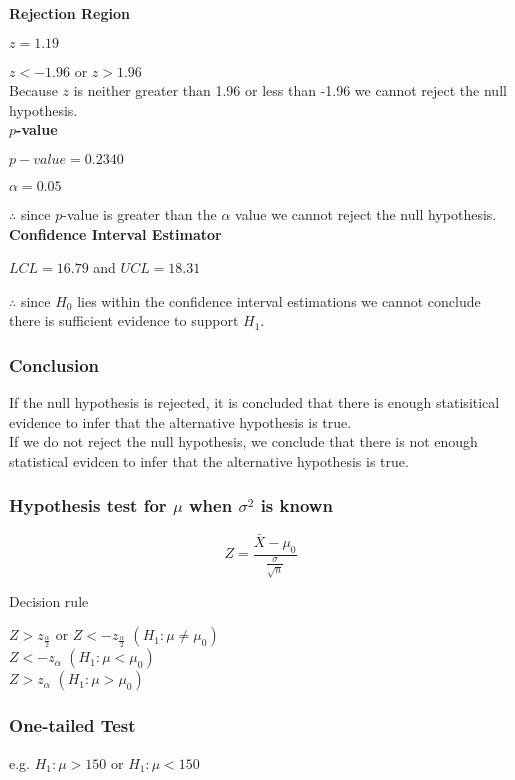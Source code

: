 \documentclass{article}
\begin{document}
\textbf{Rejection Region}

$ z = 1.19 $

$ z < -1.96$ or $z > 1.96$\\

Because $z$ is neither greater than 1.96 or less than -1.96 we cannot reject the null hypothesis.\\

\textbf{$p$-value}

$ p-value = 0.2340 $

$\alpha = 0.05$

$\therefore$ since $p$-value is greater than the $\alpha$ value we cannot reject the null hypothesis.\\


\textbf{Confidence Interval Estimator}

$ LCL = 16.79$ and $UCL = 18.31$

$\therefore$ since $H_0$ lies within the confidence interval estimations we cannot conclude there is sufficient evidence to support $H_1$.\\


\subsubsection{Conclusion}
If the null hypothesis is rejected, it is concluded that there is enough statisitical evidence to infer that the alternative hypothesis is true.\\

If we do not reject the null hypothesis, we conclude that there is not enough statistical evidcen to infer that the alternative hypothesis is true.


\subsubsection{Hypothesis test for $\mu$ when $\sigma^2$ is known}

$$
Z = \frac{\bar{X} - \mu_0}{\frac{\sigma}{\sqrt{n}}}
$$

Decision rule

$Z > z_{\frac{\alpha}{2}}$ or $Z < -z_{\frac{\alpha}{2}}$ $(H_1 : \mu \neq \mu_0)$
\\

$Z < -z_{\alpha}$ $(H_1 : \mu < \mu_0)$
\\

$Z > z_{\alpha}$ $(H_1 : \mu > \mu_0)$


\subsubsection{One-tailed Test}
e.g. $ H_1 : \mu > 150$ or $ H_1 : \mu < 150$
\end{document}

